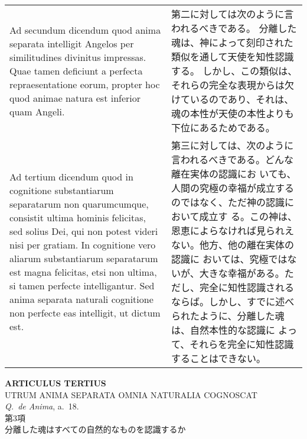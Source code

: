 \documentclass[10pt]{jsarticle} %
\begin{document}
\begin{longtable}{p{21em}p{21em}}
\\


{\sc Ad secundum dicendum} quod anima separata
intelligit Angelos per similitudines divinitus impressas. Quae tamen
deficiunt a perfecta repraesentatione eorum, propter hoc quod animae
natura est inferior quam Angeli.

&
第二に対しては次のように言われるべきである。
分離した魂は、神によって刻印された類似を通して天使を知性認識する。
しかし、この類似は、それらの完全な表現からは欠けているのであり、それは、
 魂の本性が天使の本性よりも下位にあるためである。



\\


{\sc Ad tertium dicendum} quod in cognitione
substantiarum separatarum non quarumcumque, consistit ultima hominis
felicitas, sed solius Dei, qui non potest videri nisi per gratiam. In
cognitione vero aliarum substantiarum separatarum est magna felicitas,
etsi non ultima, si tamen perfecte intelligantur. Sed anima separata
naturali cognitione non perfecte eas intelligit, ut dictum est.

& 第三に対しては、次のように言われるべきである。どんな離在実体の認識にお
いても、人間の究極の幸福が成立するのではなく、ただ神の認識において成立す
る。この神は、恩恵によらなければ見られえない。他方、他の離在実体の認識に
おいては、究極ではないが、大きな幸福がある。ただし、完全に知性認識される
ならば。しかし、すでに述べられたように、分離した魂は、自然本性的な認識に
よって、それらを完全に知性認識することはできない。



\end{longtable}

\newpage
{}

\begin{center}
 {\Large {\bf ARTICULUS TERTIUS}}\\
 {\large UTRUM ANIMA SEPARATA OMNIA NATURALIA COGNOSCAT}\\
 {\footnotesize {\it Q.~de Anima}, a.~18.}\\
 {\Large 第3項\\分離した魂はすべての自然的なものを認識するか}
\end{center}
\end{document}
